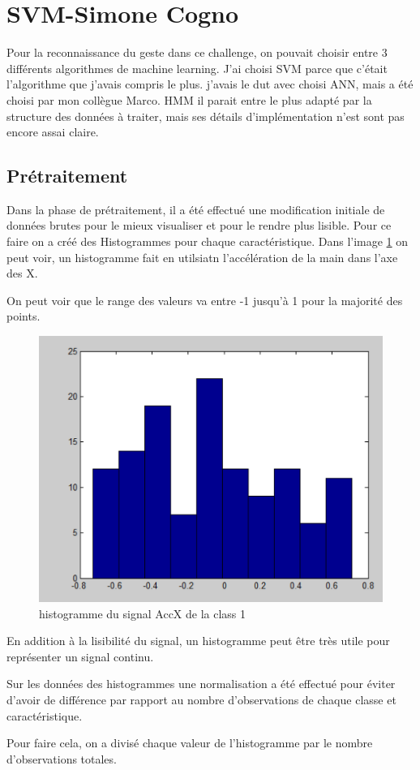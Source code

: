 

\chapter*{SVM-Simone Cogno}
Pour la reconnaissance du geste dans ce challenge, on pouvait choisir entre 3 différents algorithmes de machine learning. J'ai choisi SVM parce que c'était l'algorithme que j'avais compris le plus. j'avais le dut avec choisi ANN, mais a été choisi par mon collègue Marco. HMM il parait entre le plus adapté par la structure des données à traiter, mais ses détails d'implémentation n'est sont pas encore assai claire.

\section*{Prétraitement}
Dans la phase de prétraitement, il a été effectué une modification initiale de données brutes pour le mieux visualiser et pour le rendre plus lisible.
 Pour ce faire on a créé des Histogrammes pour chaque caractéristique.
Dans l'image \ref{fig:prehist} on peut voir, un histogramme fait en utilsiatn l'accélération de la main dans l'axe des X.

On peut voir que le range des valeurs va entre -1  jusqu'à 1 pour la majorité des points.
\begin{figure}[h]
  \centering
    \includegraphics[width=0.5\linewidth]{img/pretraitement/hist10.png}
  \caption{histogramme du signal AccX de la class 1}
  \label{fig:prehist}
\end{figure}

En addition à la lisibilité du signal, un histogramme peut être très utile pour représenter un signal continu.

Sur les données des histogrammes une normalisation a été effectué pour éviter d'avoir de différence par rapport au nombre d'observations de chaque classe  et caractéristique.

Pour faire cela, on a divisé chaque valeur de l'histogramme par le nombre d'observations totales.

